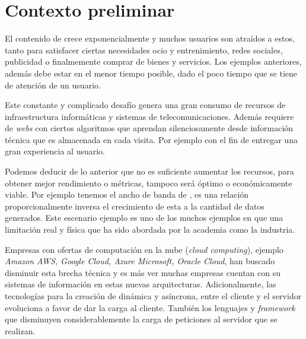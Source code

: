 
\section{Contexto preliminar}\label{sec:preliminar}

	
El contenido de \inet crece exponencialmente y muchos usuarios son atraídos a estos, tanto para satisfacer ciertas necesidades   ocio y entrenimiento, redes sociales,  publicidad o finalmemente comprar de bienes y servicios. Los ejemplos anteriores, además debe estar en el menor tiempo posible, dado el poco tiempo que se tiene de atención de un usuario.

Este constante y complicado desafío genera una gran consumo de recursos de infraestructura informáticas y sistemas de telecomunicaciones. Además  requiere de \emph{webs} con ciertos algoritmos que aprendan silenciosamente desde información técnica que es almacenada en cada visita. Por ejemplo con el fin de entregar una gran experiencia al usuario.



Podemos deducir de lo anterior que no es suficiente aumentar los recursos, para obtener  mejor rendimiento o métricas, tampoco será óptimo o económicamente viable. Por ejemplo tenemos el ancho de banda de \inet, es una relación proporcionalmente inversa el crecimiento de esta a la cantidad de datos generados. Este escenario ejemplo es uno de los muchos ejemplos en que una limitación real y física que ha sido abordada por la academia como la industria. 

Empresas con ofertas de computación en la nube (\emph{cloud computing}), ejemplo \emph{Amazon AWS, Google Cloud, Azure Microsoft, Oracle Cloud}, han buscado disminuir esta brecha técnica y es más ver muchas empresas cuentan con su sistemas de información en estas nuevas arquitecturas. Adicionalmente, las tecnologías para la creación de \www dinámica y asíncrona, entre el cliente y el servidor evoluciona a favor de dar la carga al cliente. También los lenguajes y \emph{framework} que disminuyen considerablemente la carga de peticiones al servidor que se realizan.


